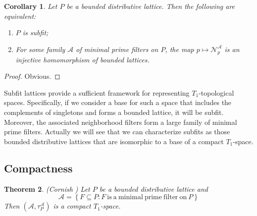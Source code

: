 \documentclass{article}
\newcommand{\aaa}{\mathcal{A} }
\newcommand{\open}[1]{\mathcal{N}^{\mathcal{A}}_{#1}}
\newcommand{\atpa}{(\aaa, \tau^\aaa_P)}
\theoremstyle{plain}
\newtheorem{theorem}{Theorem}[subsection]
\newtheorem{corollary}[theorem]{Corollary}
\theoremstyle{definition}
\theoremstyle{remark}
\newcommand{\bp}[1]{\left\lbrace #1 \right\rbrace}
\newcommand{\0}{\mathbbm 0}
\newcommand{\1}{\mathbbm 1}
\newcommand{\2}{\mathbbm 2}
\begin{document}
\begin{corollary}
\label{cor:subfit}
Let $P$ be a bounded distributive lattice. Then the following are equivalent:
\begin{enumerate}
\item
$P$ is subfit;
\item
For some family $\aaa$ of minimal prime filters on $P$, the map $p\mapsto \open{p}$ is an injective homomorphism of bounded lattices.
\end{enumerate}
\end{corollary}

\begin{proof}
Obvious.
\end{proof}


Subfit lattices provide a sufficient framework for representing \( T_1 \)-topological spaces. Specifically, if we consider a base for such a space that includes the complements of singletons and forms a bounded lattice, it will be subfit. Moreover, the associated neighborhood filters form a large  family of minimal prime filters. Actually we will see that we can characterize subfits as those bounded distributive lattices that are isomorphic to a base of a compact $T_1$-space.



\subsection{Compactness}
\label{subsec:compactness}


\begin{theorem}
 (Cornish \cite{Cornish1972NormalL})
    \label{thm:compactT1} 
    Let $P$ be a bounded distributive lattice and 
    \[
    \aaa=\bp{F \subseteq P: F\mathrm{ \ is\ a\ minimal\ prime\ filter \ on \ }P}
    \]
    Then $\atpa$ is a compact $T_1$-space. 
\end{theorem}
\end{document}
